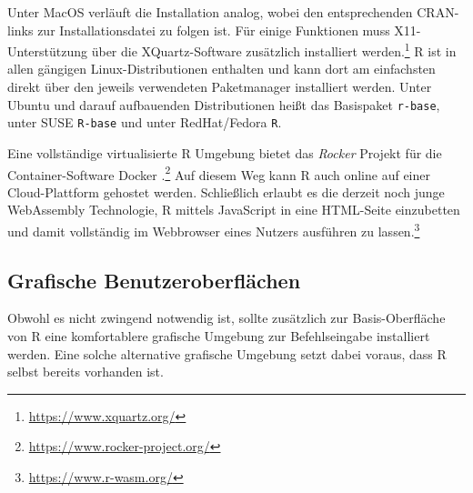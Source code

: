 Unter MacOS verläuft die Installation analog, wobei den entsprechenden CRAN-links zur Installationsdatei zu folgen ist. Für einige Funktionen muss X11-Unterstützung über die XQuartz-Software zusätzlich installiert werden.\footnote{\url{https://www.xquartz.org/}} R ist in allen gängigen Linux-Distributionen enthalten und kann dort am einfachsten direkt über den jeweils verwendeten Paketmanager installiert werden. Unter Ubuntu und darauf aufbauenden Distributionen heißt das Basispaket \lstinline!r-base!, unter SUSE \lstinline!R-base! und unter RedHat/Fedora \lstinline!R!.

Eine vollständige virtualisierte R Umgebung bietet das \emph{Rocker} Projekt für die Container-Software Docker \cite{Boettiger2017}.\footnote{\url{https://www.rocker-project.org/}} Auf diesem Weg kann R auch online auf einer Cloud-Plattform gehostet werden. Schließlich erlaubt es die derzeit noch junge WebAssembly Technologie, R mittels JavaScript in eine HTML-Seite einzubetten und damit vollständig im Webbrowser eines Nutzers ausführen zu lassen.\footnote{\url{https://www.r-wasm.org/}}

\subsection{Grafische Benutzeroberflächen}
\label{sec:gui}

Obwohl es nicht zwingend notwendig ist, sollte zusätzlich zur Basis-Oberfläche von R eine komfortablere grafische Umgebung zur Befehlseingabe installiert werden. Eine solche alternative grafische Umgebung setzt dabei voraus, dass R selbst bereits vorhanden ist.

